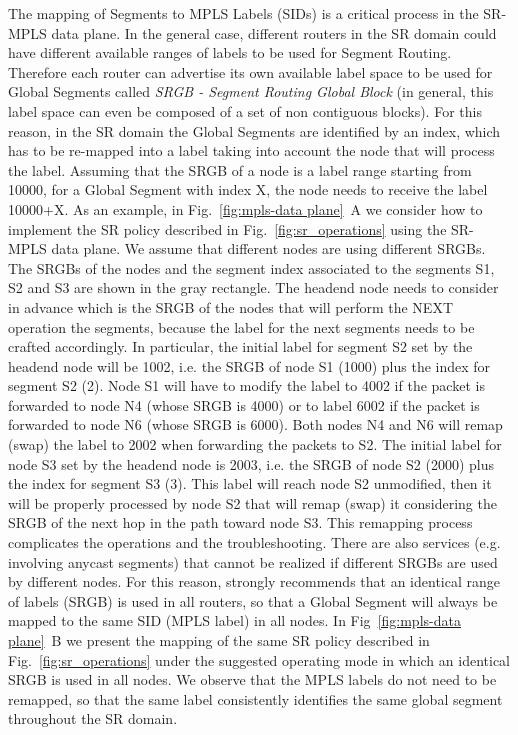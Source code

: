 The mapping of Segments to MPLS Labels (SIDs) is a critical process in the SR-MPLS data plane. In the general case, different routers in the SR domain could have different available ranges of labels to be used for Segment Routing. Therefore each router can advertise its own available label space to be used for Global Segments called \textit{SRGB - Segment Routing Global Block} (in general, this label space can even be composed of a set of non contiguous blocks). For this reason, in the SR domain the Global Segments are identified by an index, which has to be re-mapped into a label taking into account the node that will process the label. Assuming that the SRGB of a node is a label range starting from 10000, for a Global Segment with index X, the node needs to receive the label 10000+X. As an example, in Fig.~\ref{fig:mpls-data plane}~A we consider how to implement the SR policy described in Fig.~\ref{fig:sr_operations} using the SR-MPLS data plane. We assume that different nodes are using different SRGBs. The SRGBs of the nodes and the segment index associated to the segments S1, S2 and S3 are shown in the gray rectangle. The headend node needs to consider in advance which is the SRGB of the nodes that will perform the NEXT operation the segments, because the label for the next segments needs to be crafted accordingly. In particular, the initial label for segment S2 set by the headend node will be 1002, i.e. the SRGB of node S1 (1000) plus the index for segment S2 (2). Node S1 will have to modify the label to 4002 if the packet is forwarded to node N4 (whose SRGB is 4000) or to label 6002 if the packet is forwarded to node N6 (whose SRGB is 6000). Both nodes N4 and N6 will remap (swap) the label to 2002 when forwarding the packets to S2. The initial label for node S3 set by the headend node is 2003, i.e. the SRGB of node S2 (2000) plus the index for segment S3 (3). This label will reach node S2 unmodified, then it will be properly processed by node S2 that will remap (swap) it considering the SRGB of the next hop in the path toward node S3. This remapping process complicates the operations and the troubleshooting. There are also services (e.g. involving anycast segments) that cannot be realized if different SRGBs are used by different nodes. For this reason, \cite{rfc8402} strongly recommends that an identical range of labels (SRGB) is used in all routers, so that a Global Segment will always be mapped to the same SID (MPLS label) in all nodes. In Fig~\ref{fig:mpls-data plane}~B we present the mapping of the same SR policy described in Fig.~\ref{fig:sr_operations} under the suggested operating mode in which an identical SRGB is used in all nodes. We observe that the MPLS labels do not need to be remapped, so that the same label consistently identifies the same global segment throughout the SR domain.

